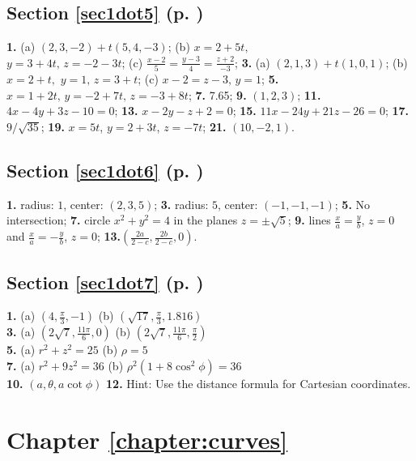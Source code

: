 \begin{multicols}{2}
\subsection*{Section \ref{sec1dot5} (p. \pageref{sec1dot5})}
\textbf{1.} 
(a) $(2,3,-2) + t(5,4,-3)$; \quad 
(b) $x = 2 + 5t,$\\$y = 3 + 4t, \, z = -2 - 3t$; \quad 
(c) $\frac{x - 2}{5} = \frac{y - 3}{4} = \frac{z + 2}{-3}$;\quad
\textbf{3.} 
(a) $(2,1,3) + t(1,0,1)$; \quad 
(b) $x = 2 + t,$ $y = 1, \, z = 3 + t$;\quad 
(c) $x - 2 = z - 3, \, y = 1$;\quad
\textbf{5.} $x = 1 + 2t, \, y = -2 + 7t, \, z = -3 + 8t$;\quad
\textbf{7.} 7.65; \quad
\textbf{9.} $(1,2,3)$;\quad
\textbf{11.} $4x - 4y + 3z - 10 = 0$;\quad
\textbf{13.} $x - 2y - z + 2 = 0$;\quad
\textbf{15.}
$11x - 24y + 21z - 26 = 0$; \quad 
\textbf{17.} $9/\sqrt{35}$;\quad
\textbf{19.} $x = 5t$, $y = 2 + 3t$, $z = -7t$;\quad
\textbf{21.} $(10,-2,1)$.

\subsection*{Section \ref{sec1dot6} (p. \pageref{sec1dot6})}
\textbf{1.} radius: $1$, center: $(2,3,5)$; \quad \textbf{3.} radius: $5$, center: $(-1,-1,-1)$; \quad \textbf{5.} No intersection;
\textbf{7.} circle $x^2 + y^2 = 4$ in the planes $z = \pm \sqrt{5}$; \quad
\textbf{9.} lines
$\frac{x}{a} = \frac{y}{b}$, $z = 0$ and $\frac{x}{a} = -\frac{y}{b}$, $z = 0$; \quad
\textbf{13.}$\left( \frac{2a}{2 - c}, \frac{2b}{2 - c}, 0 \right)$.

\subsection*{Section \ref{sec1dot7} (p. \pageref{sec1dot7})}
\textbf{1.} (a) $(4,\frac{\pi}{3},-1)$ \quad (b) $(\sqrt{17},\frac{\pi}{3},1.816)$\\\textbf{3.} (a)
$(2\sqrt{7},\frac{11\pi}{6},0)$ \quad (b) $(2\sqrt{7},\frac{11\pi}{6},\frac{\pi}{2})$\\\textbf{5.} (a) $r^2 + z^2 = 25$
\quad (b) $\rho = 5$\\\textbf{7.} (a) $r^2 + 9z^2 = 36$ \quad (b) $\rho^2 ( 1 + 8 \cos^2 \phi ) = 36$\\
\textbf{10.} $(a,\theta,a \cot \phi )$ \quad \textbf{12.} Hint: Use the distance formula for Cartesian coordinates.

\section*{Chapter \ref{chapter:curves}}

\end{multicols}
